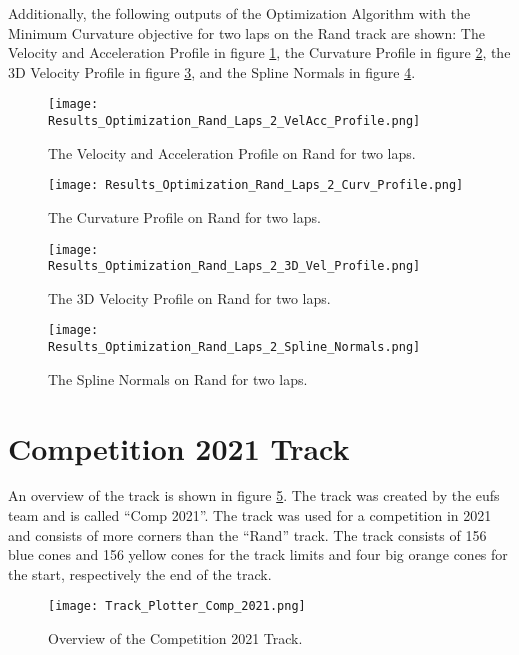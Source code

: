 Additionally, the following outputs of the Optimization Algorithm with the Minimum Curvature objective for two laps on the Rand track are shown: The Velocity and Acceleration Profile in figure \ref{fig:Results Rand Laps 2 VelAcc Profile}, the Curvature Profile in figure \ref{fig:Results Rand Laps 2 Curv Profile}, the 3D Velocity Profile in figure \ref{fig:Results Rand Laps 2 3D Vel Profile}, and the Spline Normals in figure \ref{fig:Results Rand Laps 2 Spline Normals}.
\begin{figure}[H]
    \centering
    \texttt{[image: Results\_Optimization\_Rand\_Laps\_2\_VelAcc\_Profile.png]}
    \caption{The Velocity and Acceleration Profile on Rand for two laps.}
    \label{fig:Results Rand Laps 2 VelAcc Profile}
\end{figure}
\begin{figure}[H]
    \centering
    \texttt{[image: Results\_Optimization\_Rand\_Laps\_2\_Curv\_Profile.png]}
    \caption{The Curvature Profile on Rand for two laps.}
    \label{fig:Results Rand Laps 2 Curv Profile}
\end{figure}
\begin{figure}[H]
    \centering
    \texttt{[image: Results\_Optimization\_Rand\_Laps\_2\_3D\_Vel\_Profile.png]}
    \caption{The 3D Velocity Profile on Rand for two laps.}
    \label{fig:Results Rand Laps 2 3D Vel Profile}
\end{figure}
\begin{figure}[H]
    \centering
    \texttt{[image: Results\_Optimization\_Rand\_Laps\_2\_Spline\_Normals.png]}
    \caption{The Spline Normals on Rand for two laps.}
    \label{fig:Results Rand Laps 2 Spline Normals}
\end{figure}

\section{Competition 2021 Track} \label{sec:Results Competition 2021 Track}
An overview of the track is shown in figure \ref{fig:Results Comp 2021 Initial}. The track was created by the \acrshort{eufs} team and is called ``Comp 2021''. \cite{eufs_sim_gitlab} The track was used for a competition in 2021 and consists of more corners than the ``Rand'' track. The track consists of 156 blue cones and 156 yellow cones for the track limits and four big orange cones for the start, respectively the end of the track.
\begin{figure}[H]
    \centering
    \texttt{[image: Track\_Plotter\_Comp\_2021.png]}
    \caption{Overview of the Competition 2021 Track.}
    \label{fig:Results Comp 2021 Initial}
\end{figure}


